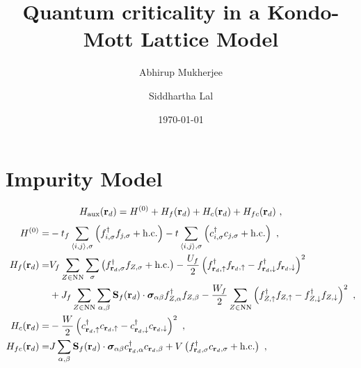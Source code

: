 \documentclass[%
reprint,
superscriptaddress,
groupedaddress,
superscriptaddress,
onecolumn,
]{revtex4-2}
\begin{document}
\title{Quantum criticality in a Kondo-Mott Lattice Model}

\author{Abhirup Mukherjee}
\author{Siddhartha Lal}

\date{\today}

\maketitle
\section{Impurity Model}
\begin{equation}\begin{aligned}
	H_\text{aux}({\bf r}_d) = H^{(0)} + H_f({\bf r}_d) + H_c({\bf r}_d) + H_{fc}({\bf r}_d)~,
\end{aligned}\end{equation}
\begin{equation}\begin{aligned}
	H^{(0)} =& -t_f\sum_{\braket{i,j},\sigma}\left(f^\dagger_{i,\sigma}f_{j,\sigma} + \text{h.c.}\right) -t\sum_{\braket{i,j},\sigma}\left(c^\dagger_{i,\sigma}c_{j,\sigma} + \text{h.c.}\right)~,\\
	H_f({\bf r}_d) =& V_f\sum_{Z \in \text{NN}}\sum_{\sigma}\left(f^\dagger_{{\bf r}_d,\sigma} f_{Z,\sigma} + \text{h.c.}\right) - \frac{U_f}{2}\left(f^\dagger_{{\bf r}_d,\uparrow}f_{{\bf r}_d,\uparrow} - f^\dagger_{{\bf r}_d,\downarrow}f_{{\bf r}_d,\downarrow}\right)^2 \\
				   &+ J_f\sum_{Z \in \text{NN}}\sum_{\alpha,\beta}{\bf S}_f({\bf r}_d) \cdot {\boldsymbol{\sigma}}_{\alpha\beta}f^\dagger_{Z,\alpha}f_{Z,\beta} - \frac{W_f}{2} \sum_{Z \in \text{NN}}\left(f^\dagger_{Z,\uparrow}f_{Z,\uparrow} - f^\dagger_{Z,\downarrow}f_{Z,\downarrow} \right)^2~,\\
	H_c({\bf r}_d) =& - \frac{W}{2}\left(c^\dagger_{{\bf r}_d,\uparrow}c_{{\bf r}_d,\uparrow} - c^\dagger_{{\bf r}_d,\downarrow}c_{{\bf r}_d,\downarrow} \right)^2~,\\
	H_{fc}({\bf r}_d) =& J\sum_{\alpha,\beta}{\bf S}_f({\bf r}_d) \cdot {\boldsymbol{\sigma}}_{\alpha\beta}c^\dagger_{{\bf r}_d,\alpha}c_{{\bf r}_d,\beta} + V \left(f^\dagger_{{\bf r}_d,\sigma} c_{{\bf r}_d,\sigma} + \text{h.c.}\right)~,\\
\end{aligned}\end{equation}
\end{document}

